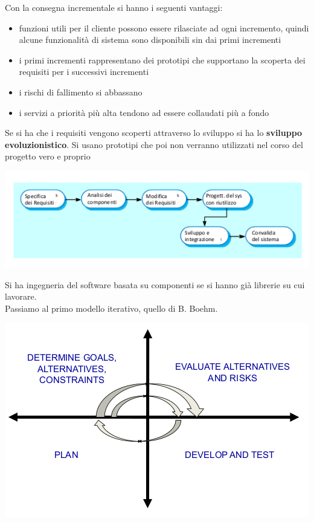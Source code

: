 \documentclass[a4paper,12pt, oneside]{book}
\begin{document}
Con la consegna incrementale si hanno i seguenti vantaggi:
\begin{itemize}
	\item funzioni utili per il cliente possono essere rilasciate ad ogni incremento, quindi alcune funzionalità di sistema sono disponibili sin dai primi incrementi
	\item i primi incrementi rappresentano dei prototipi che supportano la scoperta dei requisiti per i successivi incrementi
	\item i rischi di fallimento si abbassano
	\item i servizi a priorità più alta tendono ad essere collaudati più a fondo
\end{itemize}
Se si ha che i requisiti vengono scoperti attraverso lo sviluppo si ha lo \textbf{sviluppo evoluzionistico}. Si usano prototipi che poi non verranno utilizzati nel corso del progetto vero e proprio\\
\begin{center}
	\includegraphics[scale=0.7]{img/ms.png}
\end{center}
Si ha ingegneria del software basata su componenti se si hanno già librerie su cui lavorare.\\
Passiamo al primo modello iterativo, quello di B. Boehm.
\begin{center}
	\includegraphics[scale=0.7]{img/ms2.png}
\end{center}
\end{document}
